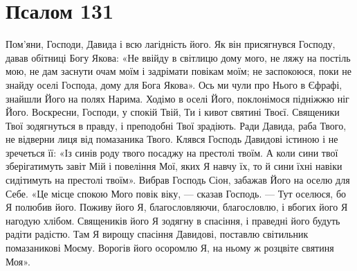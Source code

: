 \documentclass[chapters.tex]{subfiles}
\begin{document}
\section{Псалом 131}
Пом’яни, Господи, Давида і всю лагідність його. Як він присягнувся Господу, давав обітниці Богу Якова: «Не ввійду в світлицю дому мого, не ляжу на постіль мою, не дам заснути очам моїм і задрімати повікам моїм; не заспокоюся, поки не знайду оселі Господа, дому для Бога Якова». Ось ми чули про Нього в Єфрафі, знайшли Його на полях Нарима. Ходімо в оселі Його, поклонімося підніжжю ніг Його. Воскресни, Господи, у спокій Твій, Ти і кивот святині Твоєї. Священики Твої зодягнуться в правду, і преподобні Твої зрадіють. Ради Давида, раба Твого, не відверни лиця від помазаника Твого. Клявся Господь Давидові істиною і не зречеться її: «Із синів роду твого посаджу на престолі твоїм. А коли сини твої зберігатимуть завіт Мій і повеління Мої, яких Я навчу їх, то й сини їхні навіки сидітимуть на престолі твоїм». Вибрав Господь Сіон, забажав Його на оселю для Себе. «Це місце спокою Мого повік віку, — сказав Господь. — Тут оселюся, бо Я полюбив його. Поживу його Я, благословляючи, благословлю, і вбогих його Я нагодую хлібом. Священиків його Я зодягну в спасіння, і праведні його будуть радіти радістю. Там Я вирощу спасіння Давидові, поставлю світильник помазаникові Моєму. Ворогів його осоромлю Я, на ньому ж розцвіте святиня Моя».
\end{document}
